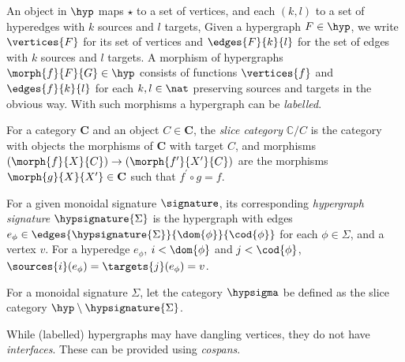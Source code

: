 An object in \(\hyp\) maps \(\star\) to a set of vertices, and each \((k,l)\) to
a set of hyperedges with \(k\) sources and \(l\) targets,
Given a hypergraph \(F \in \hyp\), we write \(\vertices{F}\) for its set of
vertices and \(\edges{F}{k}{l}\) for the set of edges with \(k\) sources and
\(l\) targets.
A morphism of hypergraphs \(\morph{f}{F}{G} \in \hyp\) consists of functions
\(\vertices{f}\) and \(\edges{f}{k}{l}\) for each \(k,l \in \nat\) preserving
sources and targets in the obvious way.
With such morphisms a hypergraph can be \emph{labelled}.

\begin{definition}
    For a category \(\mathbf{C}\) and an object \(C \in \mathbf{C}\), the
    \emph{slice category} \(\mathbb{C} / C\) is the category with objects the
    morphisms of \(\mathbf{C}\) with target \(C\), and morphisms \(
        (\morph{f}{X}{C}) \to (\morph{f^\prime}{X^\prime}{C})
    \) are the morphisms \(\morph{g}{X}{X^\prime} \in \mathbf{C}\) such that
    \(f^\prime \circ g = f\).
\end{definition}


\begin{definition}
    For a given monoidal signature \(\signature\), its corresponding
    \emph{hypergraph signature} \(\hypsignature{\Sigma}\) is the hypergraph with
    edges \(
        e_\phi \in \edges{\hypsignature{\Sigma}}{\dom{\phi}}{\cod{\phi}}
    \) for each \(\phi \in \Sigma\), and a vertex \(v\).
    For a hyperedge \(e_\phi\), \(i < \dom{\phi}\) and \(j < \cod{\phi}\), \(
        \sources{i}(e_\phi) = \targets{j}(e_\phi) = v
    \).
\end{definition}

\begin{definition}
    For a monoidal signature \(\Sigma\), let the category \(\hypsigma\) be
    defined as the slice category \(\hyp \setminus \hypsignature{\Sigma}\).
\end{definition}

While (labelled) hypergraphs may have dangling vertices, they do not have
\emph{interfaces}.
These can be provided using \emph{cospans}.

